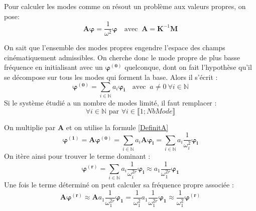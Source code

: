 \documentclass[12pt,a4paper]{report}
\begin{document}
\noindent
Pour calculer les modes comme on résout un problème aux valeurs propres, on pose:
\begin{equation}
\label{DefinitA}
\mathbf{A} \boldsymbol{\varphi} = \frac{1}{\omega^2} \boldsymbol{\varphi}
~~~\text{ avec } ~
\mathbf{A} = \mathbf{K}^{-1} \mathbf{M}
\end{equation}

On sait que l'ensemble des modes propres engendre l'espace des champs cinématiquement admissibles. On cherche donc le mode propre de plus basse fréquence en initialisant avec un $\boldsymbol{\varphi^{(0)}}$ quelconque, dont on fait l'hypothèse qu'il se décompose sur tous les modes qui forment la base. Alors il s'écrit :
\begin{equation}
\label{decomposeBasePropre}
\boldsymbol{\varphi^{(0)}} = \sum_{i \in \mathbb{N}} a_i \boldsymbol{\varphi_i}
~~~\text{ avec }~
a \ne 0 ~\forall i \in \mathbb{N}
\end{equation}
Si le système étudié a un nombre de modes limité, il faut remplacer :
\[
 \forall i \in \mathbb{N} 
 \text{ par }\forall i \in \llbracket1; NbMode \rrbracket
\]

\noindent
On multiplie par $\mathbf{A}$ et on utilise la formule \ref{DefinitA}
\begin{equation}
\boldsymbol{\varphi^{(1)}} = \mathbf{A} \boldsymbol{\varphi^{(0)}} =
\sum_{i \in \mathbb{N}} a_i \mathbf{A} \boldsymbol{\varphi_i} = 
\sum_{i \in \mathbb{N}} a_i \frac{1}{\omega_i^2} \boldsymbol{\varphi_i}
\end{equation}
On itère ainsi pour trouver le terme dominant :
\begin{equation}
\boldsymbol{\varphi^{(r)}} 
= \sum_{i \in \mathbb{N}} a_i \frac{1}{\omega_i^{2r}} \boldsymbol{\varphi_i}
\approx a_1 \frac{1}{\omega_1^{2r}} \boldsymbol{\varphi_1}
\end{equation}
Une fois le terme déterminé on peut calculer sa fréquence propre associée :
\begin{equation}
\mathbf{A} \boldsymbol{\varphi^{(r)}} 
\approx \mathbf{A} a_1 \frac{1}{\omega_1^{2r}} \boldsymbol{\varphi_1}
= 		\frac{1}{\omega_1^{2}} a_1 \frac{1}{\omega_1^{2r}}
			\boldsymbol{\varphi_1}
\approx \frac{1}{\omega_1^{2}} \boldsymbol{\varphi^{(r)}} 
\end{equation}
\end{document}
